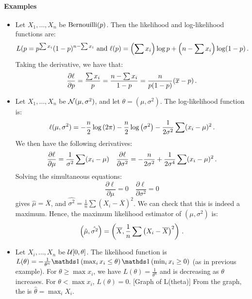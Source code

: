 \paragraph{Examples}
\begin{itemize}
\item Let $X_1, \dotsc, X_n$ be \iid $\text{Bernouilli}(p)$. Then the likelihood and log-likelihood functions are:
\[
L(p = p^{\sum x_i}(1-p)^{n - \sum x_i} \text{ and } 
\ell(p) = \left(\sum x_i\right)\log p + \left(n - \sum x_i\right)\log (1 - p) \, {.}
\]
Taking the derivative, we have that:
\[
\frac{\partial \ell}{\partial p} = \frac{\sum x_i}{p} = \frac{n - \sum x_i}{1-p} = \frac{n}{p(1-p)}(\overline{x} - p) \, {.}
\]

\item Let $X_1, \dotsc, X_n$ be \iid $\mathcal{N}(\mu, \sigma^2)$, and let $\theta = (\mu, \sigma^2)$. The log-likelihood function is:
\[
\ell (\mu, \sigma^2) = -\frac{n}{2}\log \left(2\pi\right) - \frac{n}{2}\log \left(\sigma^2\right) - \frac{1}{2\sigma^2}\sum (x_i - \mu)^2 \, {.}
\]
We then have the following derivatives:
\[
\frac{\partial \ell}{\partial \mu} = \frac{1}{\sigma^2}\sum(x_i - \mu) \quad \frac{\partial \ell}{\partial \sigma^2} = -\frac{n}{2\sigma^2} + \frac{1}{2\sigma^4}\sum (x_i - \mu)^2 \, {.}
\]
Solving the simultaneous equations:
\[
\frac{\partial \ell}{\partial \mu} = 0 \quad \frac{\partial \ell}{\partial \sigma^2} = 0
\]
gives $\hat{\mu} = \overline{X}$, and $\hat{\sigma^2} = \frac{1}{n}\sum\left(X_i - \overline{X}\right)^2$. We can check that this is indeed a maximum. 
Hence, the maximum likelihood estimator of $(\mu, \sigma^2)$ is:
\[
\left(\hat{\mu}, \hat{\sigma^2}\right) = \left(\overline{X}, \frac{1}{n}\sum\left(X_i - \overline{X}\right)^2\right) \, {.}
\]

\item Let $X_i, \dotsc, X_n$ be \iid $\mathcal{U}[0, \theta]$. The likelihood function is $L(\theta) = -\frac{1}{\theta^n}\indicator{\max_i x_i \leq \theta}\indicator{\min_i x_i \geq 0}$ (as in previous example). For $\theta \geq \max x_i$, we have $L(\theta) = \frac{1}{\theta^n}$ and is decreasing as $\theta$ increases. For $\theta < \max x_i$, $L(\theta) = 0$.
[Graph of L(theta)]
From the graph, the \mle is $\hat{\theta} = \max_i X_i$.


\end{itemize}
